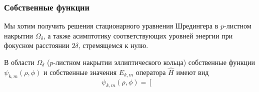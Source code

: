 \subsubsection{Собственные функции}\label{sec:ch1/sec4/sub2/sub1}
Мы хотим получить решения стационарного уравнения
Шредингера в $p$-листном накрытии  $\Omega_\delta$, а также асимптотику соответствующих уровней энергии при фокусном расстоянии $2\delta$, стремящемся к нулю. %



\begin{theorem}
В области $\Omega_\delta$ ($p$-листном накрытии эллиптического кольца) собственные функции $\psi_{k, m}(\rho, \phi)$ и собственные значения $E_{k,m}$ оператора $\hat{H}$ имеют вид
{\small
\begin{equation}
\psi_{k,m}(\rho,\phi) = 
\left[ 
\begin{array}{cll}


\end{array}
\end{equation}}
\end{theorem}
